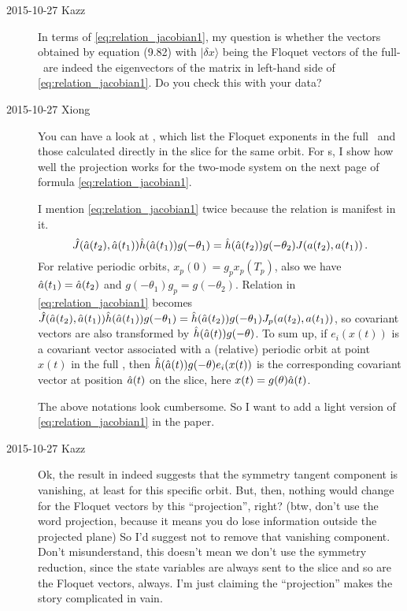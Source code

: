 \begin{description}
\item[2015-10-27 Kazz]
In terms of \eqref{eq:relation_jacobian1}, my question is whether the vectors obtained by equation (9.82) with $|\delta x\rangle$ being the Floquet vectors of the full-\statesp\ are indeed the eigenvectors of the matrix in left-hand side of \eqref{eq:relation_jacobian1}. Do you check this with your data?

\item[2015-10-27 Xiong]
You can have a look at , which list the
Floquet exponents in the full \statesp\ and those
calculated directly in the slice for the same
orbit. For \Fv s, I show how well the projection works
for the two-mode system
on the next page of formula \eqref{eq:relation_jacobian1}.

I mention \eqref{eq:relation_jacobian1} twice because the relation is
manifest in it.
\begin{equation}
  \hat{J}(\hat{a}(t_2),\hat{a}(t_1))\hat{h}
  (\hat{a}(t_1))g(-\theta_{1})=
  \hat{h}(\hat{a}(t_2))g(-\theta_{2})J(a(t_2),a(t_1))
  \,.
\end{equation}
For relative periodic orbits,
$x_{p}(0)=g_{p}x_{p}(T_{p})$, also we have
$\hat{a}(t_1)=\hat{a}(t_2)$ and $g(-\theta_{1})g_{p}=g(-\theta_{2})$.
Relation in \eqref{eq:relation_jacobian1} becomes
$\hat{J}(\hat{a}(t_2),\hat{a}(t_1))\hat{h}
(\hat{a}(t_1))g(-\theta_{1})
=\hat{h}(\hat{a}(t_2))g(-\theta_{1})J_{p}(a(t_2),a(t_1))$,
so covariant vectors are also transformed by
$\hat{h}(\hat{a}(t))g(-\theta)$. To sum up, if $e_{i}(x(t))$ is a
covariant vector associated with a (relative) periodic orbit at
point $x(t)$ in the full
\statesp, then $\hat{h}(\hat{a}(t))g(-\theta)e_{i}(x(t))$ is
the corresponding covariant vector at position $\hat{a}(t)$ on the
slice, here $x(t)=g(\theta)\hat{a}(t)$.

The above notations look cumbersome. So I want to add a
light version of \eqref{eq:relation_jacobian1} in the paper.

\item[2015-10-27 Kazz]
Ok, the result in  indeed suggests that the
symmetry tangent component is vanishing, at least for this specific
orbit. But, then, nothing would change for the Floquet vectors by this
``projection'', right? (btw, don't use the word projection, because it
means you do lose information outside the projected plane) So I'd suggest
not to remove that vanishing component. Don't misunderstand, this doesn't
mean we don't use the symmetry reduction, since the state variables are
always sent to the slice and so are the Floquet vectors, always. I'm just
claiming the ``projection'' makes the story complicated in vain.


\end{description}
